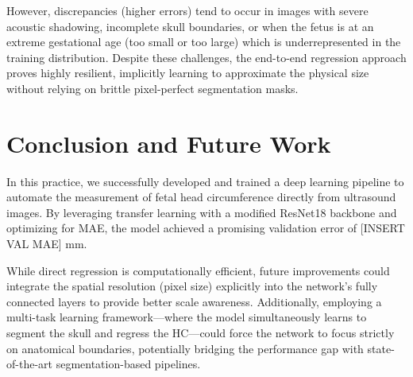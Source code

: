 \documentclass[10pt,twocolumn,letterpaper]{article}
\begin{document}
However, discrepancies (higher errors) tend to occur in images with severe acoustic shadowing, incomplete skull boundaries, or when the fetus is at an extreme gestational age (too small or too large) which is underrepresented in the training distribution. Despite these challenges, the end-to-end regression approach proves highly resilient, implicitly learning to approximate the physical size without relying on brittle pixel-perfect segmentation masks.

\section{Conclusion and Future Work}
In this practice, we successfully developed and trained a deep learning pipeline to automate the measurement of fetal head circumference directly from ultrasound images. By leveraging transfer learning with a modified ResNet18 backbone and optimizing for MAE, the model achieved a promising validation error of [INSERT VAL MAE] mm.

While direct regression is computationally efficient, future improvements could integrate the spatial resolution (pixel size) explicitly into the network's fully connected layers to provide better scale awareness. Additionally, employing a multi-task learning framework—where the model simultaneously learns to segment the skull and regress the HC—could force the network to focus strictly on anatomical boundaries, potentially bridging the performance gap with state-of-the-art segmentation-based pipelines.
\end{document}
